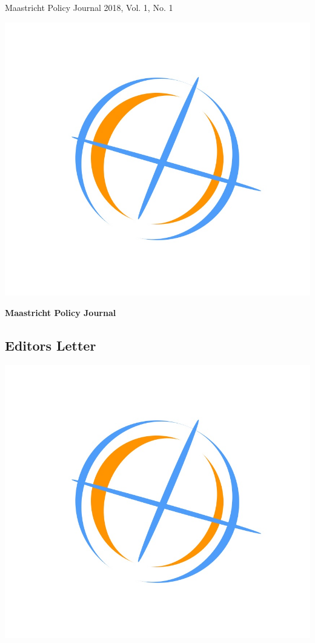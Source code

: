 \documentclass[journal,noindent,headline,12pt]{paper}
\begin{document}
\begin{titlepage} 
\begin{center}
{\huge\sf Maastricht Policy Journal} \vfill
{\Large 2018, Vol. 1, No. 1} \vfill
\begin{center}
	\includegraphics[scale=0.20]{logo1}
\end{center}
{\large\bf Maastricht Policy Journal}
\end{center} 
\end{titlepage}
\journalcontents

\onecolumn
{}
\begin{center}
	\chapter{\textbf{Editors Letter}}
\end{center}
\lipsum[1-5]
\begin{center}
	\includegraphics[scale=0.2]{logo1}
\end{center}
\end{document}
